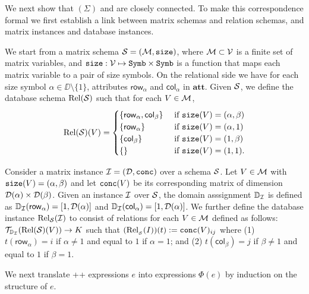 \newcommand{\row}{\mathsf{row}}
\newcommand{\rows}{\mathsf{rows}}
\newcommand{\col}{\mathsf{col}}
\newcommand{\cols}{\mathsf{cols}}

We next show that \lang$(\Sigma)$ and \ARA are closely connected. To make this correspondence formal we first establish a link between matrix schemas and relation schemas, and matrix instances and database instances.

We start from a matrix schema $\mathcal{S}=(\mathcal{M},\texttt{size})$, where $\mathcal{M}\subset \mathcal{V}$ is a finite set of matrix variables, and $\texttt{size}: \mathcal{V} \mapsto \texttt{Symb}\times \texttt{Symb}$ is a function that maps each matrix variable to a pair of size symbols. On the relational side
we have for each size symbol $\alpha\in\DD\setminus\{1\}$, attributes $\row_\alpha$ and $\col_\alpha$ in $\mathbf{att}$. 
Given $\mathcal{S}$, we define the database  schema $\text{Rel}(\mathcal{S})$ such that for each $V\in\mathcal{M}$,
\[
	\text{Rel}(\Sch)(V) = \begin{cases}
		\lbrace\row_\alpha,\col_\beta \rbrace & \text{ if $ \size(V)=(\alpha,\beta)$} \\
		\lbrace\row_\alpha \rbrace & \text{ if $ \size(V)=(\alpha,1)$} \\
		\lbrace\col_\beta \rbrace  &
	 \text{ if $ \size(V)=(1,\beta)$} \\
		\lbrace\rbrace & \text{ if $\size(V)=(1,1)$}.
\end{cases}
\]

Consider a matrix instance $\mathcal{I} = (\mathcal{D},\texttt{conc})$ over a schema $\mathcal{S}$.
Let $V\in\mathcal{M}$ with $\texttt{size}(V)=(\alpha,\beta)$ and let $\texttt{conc}(V)$ be its corresponding matrix of dimension $\mathcal{D}(\alpha)\times \mathcal{D}(\beta)$.
Given an instance $\mathcal{I}$ over $\mathcal{S}$, the domain asssignment $\mathbb{D}_{\mathcal{I}}$ is defined as 
$\mathbb{D}_{\I}(\row_\alpha)=[1,\dom(\alpha)]$ and 
$\mathbb{D}_{\I}(\col_\alpha)=[1,\dom(\alpha)]$. 
We further  define the database instance $\text{Rel}_{\mathcal{S}}(\mathcal{I})$  to consist of relations for each $V\in\mathcal{M}$ defined as follows:
$\mathcal{T}_{\mathbb{D}_{\mathcal{I}}}(\text{Rel}(\mathcal{S})(V)) \to K$ such that
$(\text{Rel}_{_{\mathcal{S}}}(I))(t):=\texttt{conc}(V)_{ij}$ where (1) $t(\row_\alpha)=i$ if $\alpha\neq 1$ and equal to $1$ if $\alpha = 1$; and (2) $t(\col_\beta)=j$ if $\beta\neq 1$ and equal to $1$ if $\beta= 1$.

We next translate \lang++ expressions $e$ into \ARA expressions $\Phi(e)$ by induction on the structure of $e$.

